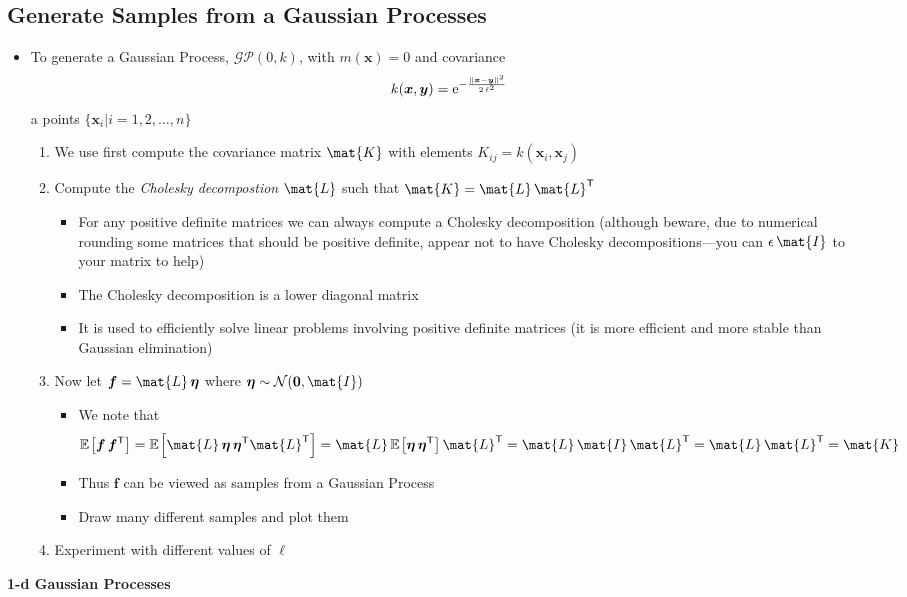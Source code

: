 \documentclass[11pt]{article}
\newcommand{\tr}{\textsf{T}}
\newcommand{\av}[2][]{\mathbb{E}_{#1\!}\left[ #2 \right]}
\newcommand{\e}[1]{{\rm e}^{#1}}
\begin{document}
\subsection{Generate Samples from a Gaussian Processes}
\label{sec:org135b5f7}
\begin{itemize}
\item To generate a Gaussian Process, \(\mathcal{GP}(0,k)\), with
\(m(\bm{x})=0\) and covariance
$$ k(\bm{x},\bm{y})=\e{-\frac{\|\bm{x}-\bm{y}\|^2}{2\,\ell^2}} $$
a points \(\{\bm{x}_i|i=1, 2, \ldots, n\}\)
\begin{enumerate}
\item We use first compute the covariance matrix \(\mat{K}\) with
elements \(K_{ij} = k(\bm{x}_i,\bm{x}_j)\)
\item Compute the \emph{Cholesky decompostion} \(\mat{L}\) such that
\(\mat{K} = \mat{L}\,\mat{L}^\tr\)
\begin{itemize}
\item For any positive definite matrices we can always compute a
Cholesky decomposition (although beware, due to numerical
rounding some matrices that should be positive definite,
appear not to have Cholesky decompositions---you can
\(\epsilon \,\mat{I}\) to your matrix to help)
\item The Cholesky decomposition is a lower diagonal matrix
\item It is used to efficiently solve linear problems involving
positive definite matrices (it is more efficient and more
stable than Gaussian elimination)
\end{itemize}
\item Now let \(\bm{f} = \mat{L}\,\bm{\eta}\) where \(\bm{\eta}\sim
        \mathcal{N}(\bm{0},\mat{I})\)
\begin{itemize}
\item We note that
$$ \av{\bm{f}\,\bm{f}^\tr} = \av{\mat{L}\,\bm{\eta}\,\bm{\eta}^\tr\mat{L}^\tr}
	  = \mat{L}\,\av{\bm{\eta}\,\bm{\eta}^\tr} \mat{L}^\tr
	  = \mat{L}\,\mat{I}\,\mat{L}^\tr =\mat{L}\,\mat{L}^\tr =
          \mat{K} $$
\item Thus \(\bm{f}\) can be viewed as samples from a Gaussian Process
\item Draw many different samples and plot them
\end{itemize}
\item Experiment with different values of \(\ell\)
\end{enumerate}
\end{itemize}

\textbf{1-d Gaussian Processes}
\end{document}
